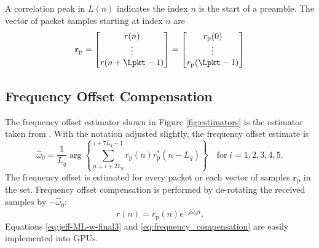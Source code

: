 A correlation peak in $L(n)$ indicates the index $n$ is the start of a preamble.
The vector of packet samples starting at index $n$ are
\begin{equation}
\mathbf{r}_\text{p} = 
\begin{bmatrix}
r(n) \\ 
\vdots \\ 
r(n+\Lpkt-1)
\end{bmatrix}
=
\begin{bmatrix}
r_\text{p}(0) \\ 
\vdots \\ 
r_\text{p}(\Lpkt-1)
\end{bmatrix}
\end{equation}

\subsection{Frequency Offset Compensation}
\label{sec:freq_offset_comp}
The frequency offset estimator shown in Figure \ref{fig:estimators} is the estimator taken from \cite[eq. (24)]{rice2014frequency}.
With the notation adjusted slightly, the frequency offset estimate is
\begin{equation}
	\hat{\omega}_0 = \frac{1}{L_q} \arg\left\{ \sum_{n=i+2L_q}^{i+7L_q-1} r_\text{p}(n)r_\text{p}^\ast(n-L_q)\right\}
	\quad
\text{for} \;
i=1,2,3,4,5.
	\label{eq:jeff-ML-w-final3}
\end{equation}
The frequency offset is estimated for every packet or each vector of samples $\mathbf{r}_\text{p}$ in the set.
Frequency offset compensation is performed by de-rotating the received samples by $-\hat{\omega}_0$:
\begin{equation}
	r(n) = r_\text{p}(n) e^{-j\hat{\omega}_0n}.
	\label{eq:frequency_compensation}
\end{equation}
Equations \eqref{eq:jeff-ML-w-final3} and \eqref{eq:frequency_compensation} are easily implemented into GPUs. 

